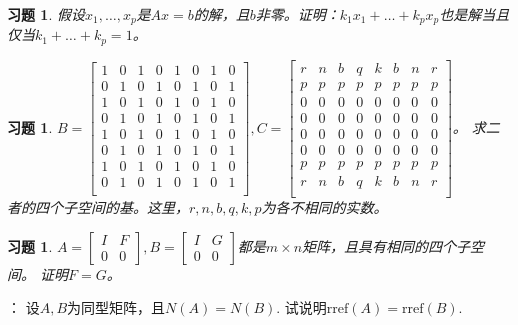 \documentclass[UTF8]{ctexart}
\newcommand{\rref}{\mathrm{rref}}
\newtheorem{ex}[thm]{习题}
\begin{document}
\begin{ex}
	假设$x_1,\dots,x_p$是$Ax=b$的解，且$b$非零。证明：$k_1x_1+\dots+k_px_p$也是解当且仅当$k_1+\dots+k_p=1$。
\end{ex}





\begin{ex}
		$B=\begin{bmatrix}
		1&0&1&0&1&0&1&0\\
		0&1&0&1&0&1&0&1\\
		1&0&1&0&1&0&1&0\\
		0&1&0&1&0&1&0&1\\
		1&0&1&0&1&0&1&0\\
		0&1&0&1&0&1&0&1\\
		1&0&1&0&1&0&1&0\\
		0&1&0&1&0&1&0&1\\
	\end{bmatrix},C=\begin{bmatrix}
	r&n&b&q&k&b&n&r\\
	p&p&p&p&p&p&p&p\\
	0&0&0&0&0&0&0&0\\
	0&0&0&0&0&0&0&0\\
	0&0&0&0&0&0&0&0\\
	0&0&0&0&0&0&0&0\\
	p&p&p&p&p&p&p&p\\
	r&n&b&q&k&b&n&r\\
	\end{bmatrix}$。
	求二者的四个子空间的基。这里，$r,n,b,q,k,p$为各不相同的实数。
\end{ex}


\begin{ex}
		$A=\begin{bmatrix}
		I & F\\0&0
	\end{bmatrix},B=\begin{bmatrix}
		I & G\\0&0
	\end{bmatrix}$都是$m\times n$矩阵，且具有相同的四个子空间。
	证明$F=G$。
\end{ex}


\vspace{2cm}
：
设$A,B$为同型矩阵，且$N(A) = N(B)$. 试说明$\rref(A) = \rref(B)$.
\end{document}
